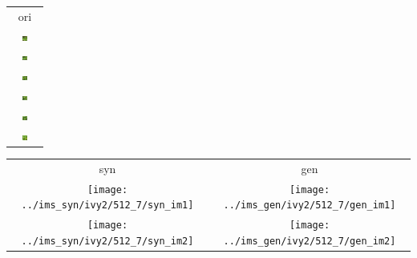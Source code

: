 \documentclass[letter]{article}
\begin{document}
\newpage

\begin{table}[h!]
	\centering
	\begin{tabular}{c}
		ori\tabularnewline
		\includegraphics[width=0.17\textwidth]{../data/ivy2/512/1} \tabularnewline		\includegraphics[width=0.17\textwidth]{../data/ivy2/512/2} \tabularnewline		\includegraphics[width=0.17\textwidth]{../data/ivy2/512/3} \tabularnewline		\includegraphics[width=0.17\textwidth]{../data/ivy2/512/4} \tabularnewline		\includegraphics[width=0.17\textwidth]{../data/ivy2/512/5} \tabularnewline		\includegraphics[width=0.17\textwidth]{../data/ivy2/512/6} \tabularnewline
	\end{tabular}
	\begin{tabular}{cc}
		syn & gen\tabularnewline
		\texttt{[image: ../ims\_syn/ivy2/512\_7/syn\_im1]} & \texttt{[image: ../ims\_gen/ivy2/512\_7/gen\_im1]} \tabularnewline
		\texttt{[image: ../ims\_syn/ivy2/512\_7/syn\_im2]} & \texttt{[image: ../ims\_gen/ivy2/512\_7/gen\_im2]} \tabularnewline

\end{tabular}
\end{table}
\end{document}
